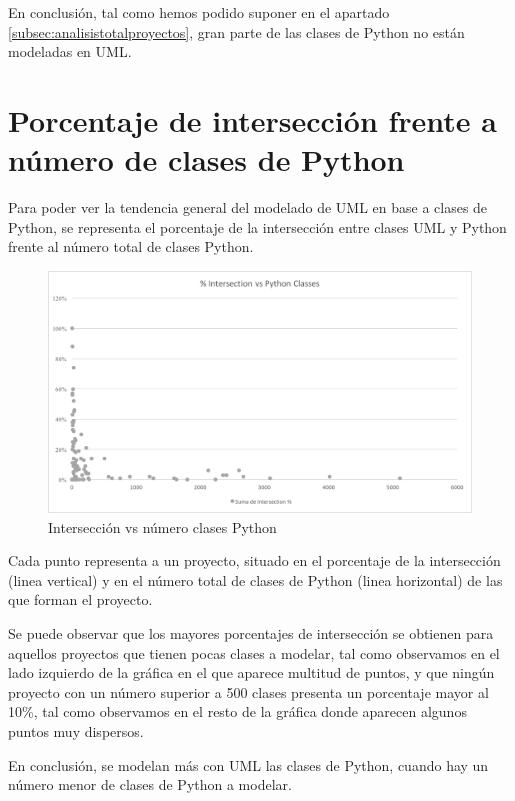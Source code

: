 \documentclass[a4paper, 12pt]{book}
\begin{document}
En conclusión, tal como hemos podido suponer en el apartado \ref{subsec:analisistotalproyectos}, gran parte
de las clases de Python no están modeladas en UML.

\section{Porcentaje de intersección frente a número de clases de Python}
\label{subsec:intersecvsclases}

Para poder ver la tendencia general del modelado de UML en base a clases de Python, se representa el porcentaje de
la intersección entre clases UML y Python frente al número total de clases Python.

\begin{figure}[htb]
  \centering
  \includegraphics[width=\textwidth, keepaspectratio]{img/GraficasResultados/intersectionvsclass}
  \caption{Intersección vs número clases Python}
  \label{fig:intersectionvsclass}
\end{figure}

Cada punto representa a un proyecto, situado en el porcentaje de la intersección (linea vertical) y en el número total
de clases de Python (linea horizontal) de las que forman el proyecto.

Se puede observar que los mayores porcentajes de intersección se obtienen para aquellos proyectos que tienen pocas
clases a modelar, tal como observamos en el lado izquierdo de la gráfica en el que aparece multitud de puntos, y que ningún proyecto con un número superior a 500 clases presenta un porcentaje mayor al 10\%, tal como observamos en el resto de la gráfica donde aparecen algunos puntos muy dispersos.

En conclusión, se modelan más con UML las clases de Python, cuando hay un número menor de clases de Python a modelar.
\end{document}
